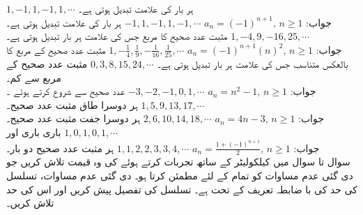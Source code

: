 $1,-1,1,-1,1,\cdots$\quad\quad
ہر بار  کی علامت تبدیل ہوتی ہے۔\\
جواب:\quad
$a_n=(-1)^{n+1},\, n\ge 1$
$-1,1,-1,1,-1,\cdots$\quad\quad
ہر بار  کی علامت تبدیل ہوتی ہے۔
$1,-4,9,-16,25,\cdots$\quad\quad
مثبت عدد صحیح کا مربع جس کی علامت ہر بار تبدیل ہوتی ہے۔\\
جواب:\quad
$a_n=(-1)^{n+1}(n)^2,\, n\ge 1$
$1,-\frac{1}{4},\frac{1}{9},-\frac{1}{16},\frac{1}{25},\cdots$\quad\quad
مثبت عدد صحیح کے مربع کا بالعکس متناسب جس کی علامت ہر بار تبدیل ہوتی ہے۔
$0,3,8,15,24,\cdots$\quad\quad
مثبت عدد صحیح کے مربع سے  کم۔\\
جواب:\quad
$a_n=n^2-1,\, n\ge 1$
$-3,-2,-1,0,1,\cdots$\quad\quad
عدد صحیح  سے شروع کرتے ہوئے ۔
$1,5,9,13,17,\cdots$\quad\quad
ہر دوسرا طاق مثبت عدد صحیح۔\\
جواب:\quad
$a_n=4n-3,\, n\ge 1$
$2,6,10,14,18,\cdots$\quad\quad
ہر دوسرا جفت مثبت عدد صحیح۔
$1,0,1,0,1,\cdots$\quad\quad
باری باری  اور \\
جواب:\quad
$a_n=\tfrac{1+(-1)^{n+1}}{2},\, n\ge 1$
$1,1,2,2,3,3,4,\cdots$\quad\quad
ہر مثبت عدد صحیح دو بار۔
\\
سوال  تا سوال  میں کیلکولیٹر کے  ساتھ تجربات کرتے ہوئے  کی وہ قیمت تلاش کریں جو دی گئی عدم مساوات کو تمام  کے لئے مطمئن کرتا ہو۔ دی گئی عدم مساوات، تسلسل کی حد کی با ضابطہ تعریف کے تحت ہے۔ تسلسل کی تفصیل پیش کریں اور اس کی حد تلاش کریں۔

